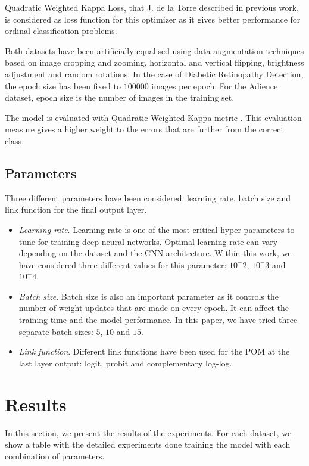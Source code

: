 \documentclass[10pt, a4paper, titlepage]{article}
\begin{document}
\begin{multicols}{2}
	Quadratic Weighted Kappa Loss, that J. de la Torre described in previous work, is considered as loss function for this optimizer as it gives better performance for ordinal classification problems.
	
	Both datasets have been artificially equalised using data augmentation techniques \cite{van2001art}\cite{krizhevsky2012imagenet} based on image cropping and zooming, horizontal and vertical flipping, brightness adjustment and random rotations. In the case of Diabetic Retinopathy Detection, the epoch size has been fixed to $100000$ images per epoch. For the Adience dataset, epoch size is the number of images in the training set.
	
	The model is evaluated with Quadratic Weighted Kappa metric \cite{ben2008comparison}. This evaluation measure gives a higher weight to the errors that are further from the correct class.
	
	\subsection{Parameters}
	Three different parameters have been considered: learning rate, batch size and link function for the final output layer.
	
	\begin{itemize}
		\item \textit{Learning rate}. Learning rate is one of the most critical hyper-parameters to tune for training deep neural networks. Optimal learning rate can vary depending on the dataset and the CNN architecture. Within this work, we have considered three different values for this parameter: $10^-2$, $10^-3$ and $10^-4$.
		\item \textit{Batch size}. Batch size is also an important parameter as it controls the number of weight updates that are made on every epoch. It can affect the training time and the model performance. In this paper, we have tried three separate batch sizes: $5$, $10$ and $15$.
		\item \textit{Link function}. Different link functions have been used for the POM at the last layer output: logit, probit and complementary log-log.
	\end{itemize}
	
	\section{Results}
	In this section, we present the results of the experiments. For each dataset, we show a table with the detailed experiments done training the model with each combination of parameters.
	

\end{multicols}
\end{document}
